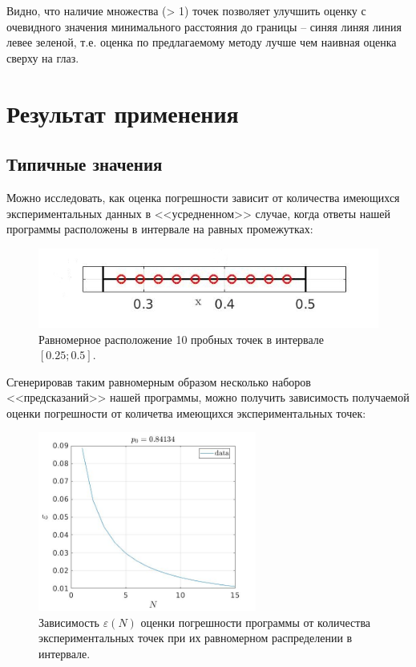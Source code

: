 \documentclass[a4paper,12pt]{article} %
\begin{document}
Видно, что наличие множества (> 1) точек позволяет улучшить оценку с очевидного значения минимального расстояния до границы -- синяя линяя линия левее зеленой, т.е. оценка по предлагаемому методу лучше чем наивная оценка сверху на глаз.

\newpage

\section{Результат применения}

\subsection{Типичные значения}

Можно исследовать, как оценка погрешности зависит от количества имеющихся экспериментальных данных в <<усредненном>> случае, когда ответы нашей программы расположены в интервале на равных промежутках:

\begin{figure}[h!]
\begin{center}
\includegraphics[width=1\textwidth]{./pics/uni_line}
\end{center}
\caption{Равномерное расположение 10 пробных точек в интервале $[0.25; 0.5]$.} \label{img:uni_line}
\end{figure}

Сгенерировав таким равномерным образом несколько наборов <<предсказаний>> нашей программы, можно получить зависимость получаемой оценки погрешности от количетва имеющихся экспериментальных точек:

\begin{figure}[h!]
\begin{center}
\includegraphics[width=0.64\textwidth]{./pics/linear}
\end{center}
\caption{Зависимость $\varepsilon(N)$ оценки погрешности программы  от количества экспериментальных точек при их равномерном распределении в интервале.} \label{img:linear}
\end{figure}
\end{document}
